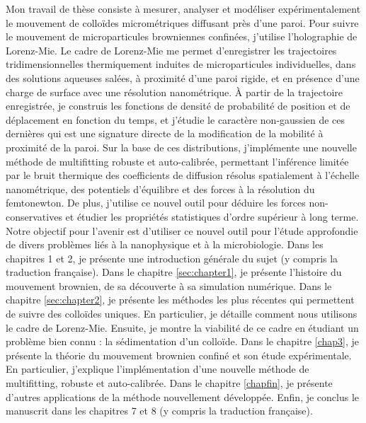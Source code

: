Mon travail de thèse consiste à mesurer, analyser et modéliser expérimentalement le mouvement de colloïdes micrométriques diffusant près d'une paroi. Pour suivre le mouvement de microparticules browniennes confinées, j'utilise l'holographie de Lorenz-Mie. Le cadre de Lorenz-Mie me permet d'enregistrer les trajectoires tridimensionnelles thermiquement induites de microparticules individuelles, dans des solutions aqueuses salées, à proximité d'une paroi rigide, et en présence d'une charge de surface avec une résolution nanométrique. À partir de la trajectoire enregistrée, je construis les fonctions de densité de probabilité de position et de déplacement en fonction du temps, et j'étudie le caractère non-gaussien de ces dernières qui est une signature directe de la modification de la mobilité à proximité de la paroi. Sur la base de ces distributions, j'implémente une nouvelle méthode de multifitting robuste et auto-calibrée, permettant l'inférence limitée par le bruit thermique des coefficients de diffusion résolus spatialement à l'échelle nanométrique, des potentiels d'équilibre et des forces à la résolution du femtonewton. De plus, j'utilise ce nouvel outil pour déduire les forces non-conservatives et étudier les propriétés statistiques d'ordre supérieur à long terme. Notre objectif pour l'avenir est d'utiliser ce nouvel outil pour l'étude approfondie de divers problèmes liés à la nanophysique et à la microbiologie.
Dans les chapitres 1 et 2, je présente une introduction générale du sujet (y compris la traduction française). Dans le chapitre \ref{sec:chapter1}, je présente l'histoire du mouvement brownien, de sa découverte à sa simulation numérique. Dans le chapitre \ref{sec:chapter2}, je présente les méthodes les plus récentes qui permettent de suivre des colloïdes uniques. En particulier, je détaille comment nous utilisons le cadre de Lorenz-Mie. Ensuite, je montre la viabilité de ce cadre en étudiant un problème bien connu : la sédimentation d'un colloïde. Dans le chapitre \ref{chap3}, je présente la théorie du mouvement brownien confiné et son étude expérimentale. En particulier, j'explique l'implémentation d'une nouvelle méthode de multifitting, robuste et auto-calibrée. Dans le chapitre \ref{chapfin}, je présente d'autres applications de la méthode nouvellement développée. Enfin, je conclus le manuscrit dans les chapitres 7 et 8 (y compris la traduction française).

\vspace{4cm}

